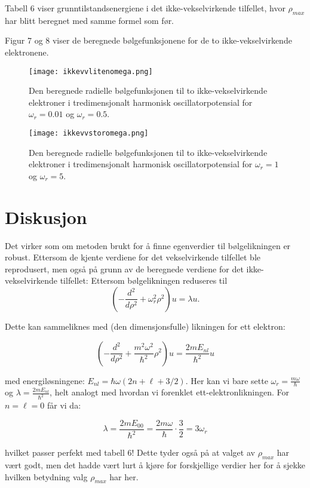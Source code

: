 \documentclass[norsk, 12pt]{article}
\newcommand{\f}{\frac}
\begin{document}
Tabell 6 viser grunntilstandsenergiene i det ikke-vekselvirkende tilfellet, hvor $\rho_{max}$ har blitt beregnet
med samme formel som før.

Figur 7 og 8 viser de beregnede bølgefunksjonene for de to ikke-vekselvirkende elektronene.

\begin{figure}[!htb]
 \centering
 \texttt{[image: ikkevvlitenomega.png]}
 \caption{Den beregnede radielle bølgefunksjonen til to ikke-vekselvirkende elektroner i tredimensjonalt
 harmonisk oscillatorpotensial for $\omega_r=0.01$ og $\omega_r=0.5$.}
\end{figure}

\begin{figure}[!htb]
 \centering
 \texttt{[image: ikkevvstoromega.png]}
 \caption{Den beregnede radielle bølgefunksjonen til to ikke-vekselvirkende elektroner i tredimensjonalt
 harmonisk oscillatorpotensial for $\omega_r=1$ og $\omega_r=5$.}
\end{figure}


\pagebreak

\newpage
\section{Diskusjon}
Det virker som om metoden brukt for å finne egenverdier til bølgelikningen er robust. Ettersom de kjente verdiene
for det vekselvirkende tilfellet ble reprodusert, men også på grunn av de beregnede verdiene for det ikke-vekselvirkende tilfellet:
Ettersom bølgelikningen reduseres til
$$\left(-\f{d^2}{d\rho^2}+\omega_r^ 2\rho^2\right) u = \lambda u.$$

Dette kan sammeliknes med (den dimensjonsfulle) likningen for ett elektron:

$$\left(-\f{d^2}{d\rho^2}+\f{m^2\omega^2}{\hbar^2}\rho^2\right) u = \f{2mE_{nl}}{\hbar^2} u $$

med energiløsningene: $E_{nl} = \hbar \omega (2n+\ell +3/2)$. Her kan vi bare sette $\omega_r = \f{m\omega}{\hbar}$
og $\lambda = \f{2mE_{nl}}{\hbar^2}$, helt analogt med hvordan vi forenklet ett-elektronlikningen.
For $n=\ell=0$ får vi da:

$$\lambda = \f{2mE_{00}}{\hbar^2} = \f{2m\omega}{\hbar}\cdot \f{3}{2} = 3\omega_r$$

hvilket passer perfekt med tabell 6! Dette tyder også på at valget av $\rho_{max}$ har vært godt, men det hadde vært lurt
å kjøre for forskjellige verdier her for å sjekke hvilken betydning valg $\rho_{max}$ har her.
\end{document}
